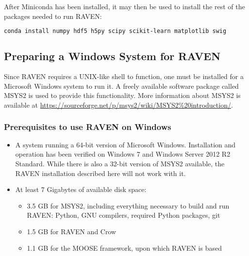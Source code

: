 After Miniconda has been installed, it may then be used to install the rest of the packages needed to run RAVEN:

\begin{lstlisting}[language=bash]
conda install numpy hdf5 h5py scipy scikit-learn matplotlib swig
\end{lstlisting}

\subsection{Preparing a Windows System for RAVEN}
\label{sysprep_windows}

Since RAVEN requires a UNIX-like shell to function, one must be installed for a Microsoft
Windows system to run it.  A freely available software package called MSYS2 is used to
provide this functionality.  More information about MSYS2 is available at 
\url{https://sourceforge.net/p/msys2/wiki/MSYS2%20introduction/}.

\subsubsection{Prerequisites to use RAVEN on Windows}
\begin{itemize}
    \item A system running a 64-bit version of Microsoft Windows. Installation and operation 
        has been verified on Windows 7 and Windows Server 2012 R2 Standard. While there 
        is also a 32-bit version of MSYS2 available, the RAVEN installation described here will not work with it.
    \item At least 7 Gigabytes of available disk space:
    \begin{itemize}
        \item 3.5 GB for MSYS2, including everything necessary to build and run RAVEN: Python, GNU compilers, required Python packages, git
        \item 1.5 GB for RAVEN and Crow
        \item 1.1 GB for the MOOSE framework, upon which RAVEN is based
    \end{itemize}
\end{itemize}

